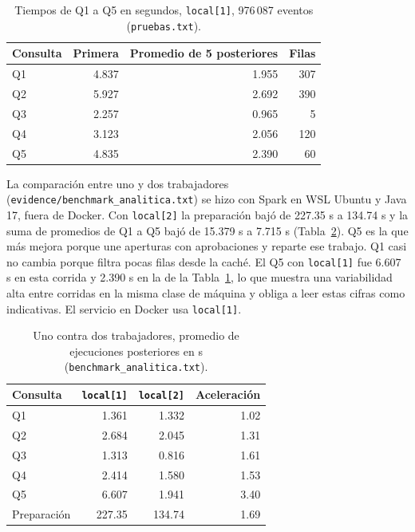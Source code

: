 \documentclass[conference]{IEEEtran}
\begin{document}
\begin{table}[!t]
\caption{Tiempos de Q1 a Q5 en segundos, \texttt{local[1]}, 976\,087 eventos (\texttt{pruebas.txt}).}
\label{tab:spark}
\centering\footnotesize
\begin{tabular}{@{}l r r r@{}}
\toprule
\textbf{Consulta} & \textbf{Primera} & \textbf{Promedio de 5 posteriores} & \textbf{Filas} \\
\midrule
Q1 & 4.837 & 1.955 & 307 \\
Q2 & 5.927 & 2.692 & 390 \\
Q3 & 2.257 & 0.965 & 5 \\
Q4 & 3.123 & 2.056 & 120 \\
Q5 & 4.835 & 2.390 & 60 \\
\bottomrule
\end{tabular}
\end{table}

La comparación entre uno y dos trabajadores (\texttt{evidence/benchmark\_analitica.txt}) se hizo con Spark en WSL Ubuntu y Java 17, fuera de Docker. Con \texttt{local[2]} la preparación bajó de 227.35 s a 134.74 s y la suma de promedios de Q1 a Q5 bajó de 15.379 s a 7.715 s (Tabla~\ref{tab:workers}). Q5 es la que más mejora porque une aperturas con aprobaciones y reparte ese trabajo. Q1 casi no cambia porque filtra pocas filas desde la caché. El Q5 con \texttt{local[1]} fue 6.607 s en esta corrida y 2.390 s en la de la Tabla~\ref{tab:spark}, lo que muestra una variabilidad alta entre corridas en la misma clase de máquina y obliga a leer estas cifras como indicativas. El servicio en Docker usa \texttt{local[1]}.

\begin{table}[!t]
\caption{Uno contra dos trabajadores, promedio de ejecuciones posteriores en s (\texttt{benchmark\_analitica.txt}).}
\label{tab:workers}
\centering\footnotesize
\begin{tabular}{@{}l r r r@{}}
\toprule
\textbf{Consulta} & \texttt{local[1]} & \texttt{local[2]} & \textbf{Aceleración} \\
\midrule
Q1 & 1.361 & 1.332 & 1.02 \\
Q2 & 2.684 & 2.045 & 1.31 \\
Q3 & 1.313 & 0.816 & 1.61 \\
Q4 & 2.414 & 1.580 & 1.53 \\
Q5 & 6.607 & 1.941 & 3.40 \\
Preparación & 227.35 & 134.74 & 1.69 \\
\bottomrule
\end{tabular}
\end{table}
\end{document}
